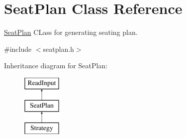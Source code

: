 \hypertarget{classSeatPlan}{\section{Seat\-Plan Class Reference}
\label{classSeatPlan}
}


\hyperlink{classSeatPlan}{Seat\-Plan} C\-Lass for generating seating plan.  




{\ttfamily \#include $<$seatplan.\-h$>$}

Inheritance diagram for Seat\-Plan\-:\begin{figure}[H]
\begin{center}
\leavevmode
\includegraphics[height=3.000000cm]{classSeatPlan}
\end{center}
\end{figure}
